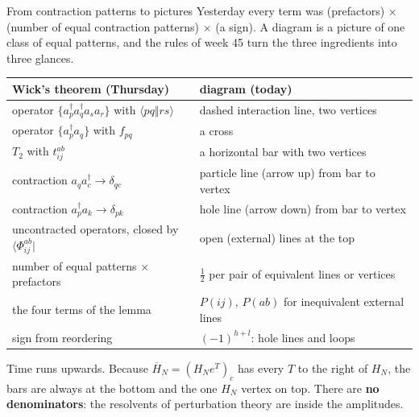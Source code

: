 \documentclass[aspectratio=169,10pt]{beamer}
\newcommand{\bra}[1]{\langle #1\vert}
\newcommand{\cre}[1]{a_{#1}^{\dagger}}
\newcommand{\ann}[1]{a_{#1}}
\newcommand{\no}[1]{\bigl\{#1\bigr\}}
\newcommand{\Hbar}{\overline{H}}
\newcommand{\as}[4]{\langle #1#2\Vert #3#4\rangle}
\begin{document}
\begin{frame}[shrink=13]{From contraction patterns to pictures}
\small
Yesterday every term was (prefactors) $\times$ (number of equal contraction patterns) $\times$ (a sign). A diagram is a picture of one class of equal patterns, and the rules of week 45 turn the three ingredients into three glances.
\begin{center}
\renewcommand{\arraystretch}{1.35}
\begin{tabular}{ll}
\toprule
Wick's theorem (Thursday) & diagram (today)\\
\midrule
operator $\no{\cre p\cre q\ann s\ann r}$ with $\as pqrs$ & dashed interaction line, two vertices\\
operator $\no{\cre p\ann q}$ with $f_{pq}$ & a cross\\
$T_2$ with $t_{ij}^{ab}$ & a horizontal bar with two vertices\\
contraction $\ann q\cre c\to\delta_{qc}$ & particle line (arrow up) from bar to vertex\\
contraction $\cre p\ann k\to\delta_{pk}$ & hole line (arrow down) from bar to vertex\\
uncontracted operators, closed by $\bra{\Phi_{ij}^{ab}}$ & open (external) lines at the top\\
number of equal patterns $\times$ prefactors & $\tfrac12$ per pair of equivalent lines or vertices\\
the four terms of the lemma & $P(ij)$, $P(ab)$ for inequivalent external lines\\
sign from reordering & $(-1)^{h+l}$: hole lines and loops\\
\bottomrule
\end{tabular}
\end{center}
Time runs upwards. Because $\Hbar_N=(H_Ne^{T})_c$ has every $T$ to the right of $H_N$, the bars are always at the bottom and the one $H_N$ vertex on top. There are \textbf{no denominators}: the resolvents of perturbation theory are inside the amplitudes.
\end{frame}
\end{document}
